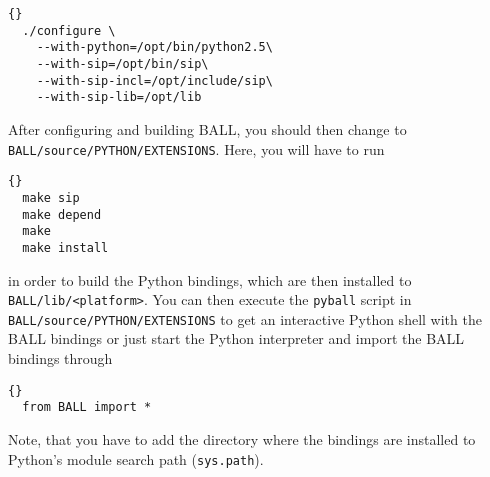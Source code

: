 \begin{lstlisting}{}
  ./configure \
    --with-python=/opt/bin/python2.5\
    --with-sip=/opt/bin/sip\
    --with-sip-incl=/opt/include/sip\
    --with-sip-lib=/opt/lib
\end{lstlisting}

\noindent
After configuring and building BALL, you should then change to {\tt
BALL/source/PYTHON/EXTENSIONS}. Here, you will have to run

\begin{lstlisting}{}
  make sip
  make depend
  make
  make install
\end{lstlisting}

\noindent
in order to build the Python bindings, which are then installed to
{\tt BALL/lib/<platform>}. You can then execute the {\tt pyball} script in 
{\tt BALL/source/PYTHON/EXTENSIONS} to get an interactive Python shell with
the BALL bindings or just start the Python interpreter and import the BALL
bindings through

\begin{lstlisting}{}
  from BALL import *
\end{lstlisting}

\noindent
Note, that you have to add the directory where the bindings are installed to
Python's module search path ({\tt sys.path}).
